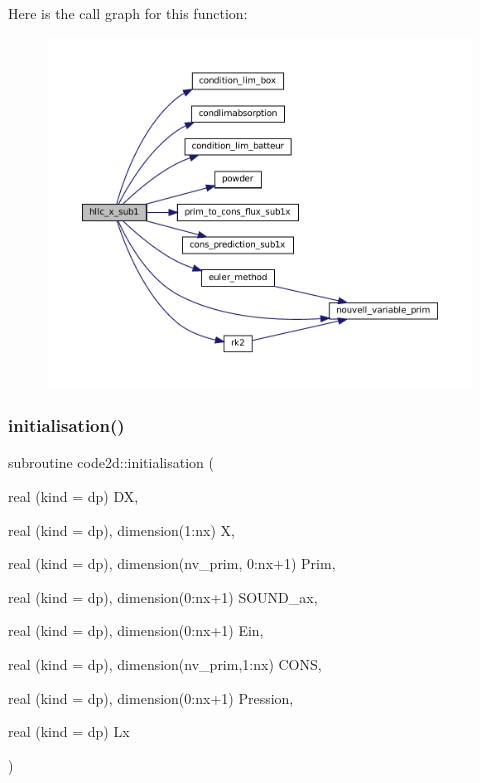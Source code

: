 Here is the call graph for this function\+:
\nopagebreak
\begin{figure}[H]
\begin{center}
\leavevmode
\includegraphics[width=350pt]{main1DOr2_8f90_a86edd837bdc9a015ebd8a46212fe70ab_cgraph}
\end{center}
\end{figure}
\mbox{\label{main1DOr2_8f90_a2ab28d5afcb8110dd4d60685348cb3d3}} 
\subsubsection{\texorpdfstring{initialisation()}{initialisation()}}
{\footnotesize\ttfamily subroutine code2d\+::initialisation (\begin{DoxyParamCaption}\item[{real (kind = dp)}]{DX,  }\item[{real (kind = dp), dimension(1\+:nx)}]{X,  }\item[{real (kind = dp), dimension(nv\+\_\+prim, 0\+:nx+1)}]{Prim,  }\item[{real (kind = dp), dimension(0\+:nx+1)}]{S\+O\+U\+N\+D\+\_\+ax,  }\item[{real (kind = dp), dimension(0\+:nx+1)}]{Ein,  }\item[{real (kind = dp), dimension(nv\+\_\+prim,1\+:nx)}]{C\+O\+NS,  }\item[{real (kind = dp), dimension(0\+:nx+1)}]{Pression,  }\item[{real (kind = dp)}]{Lx }\end{DoxyParamCaption})}


